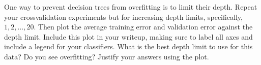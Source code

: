 \documentclass[letterpaper]{article}
\theoremstyle{definition}
\begin{document}
\begin{enumerate}
\begin{enumerate}
One way to prevent decision trees from overfitting is to limit
their depth. Repeat your crossvalidation experiments but for
increasing depth limits, specifically, \(1,2, \ldots, 20\). Then
plot the average training error and validation error against the
depth limit. Include this plot in your writeup, making sure to
label all axes and include a legend for your classifiers. What
is the best depth limit to use for this data? Do you see
overfitting? Justify your answers using the plot.
\end{enumerate}
\end{enumerate}
\end{document}
